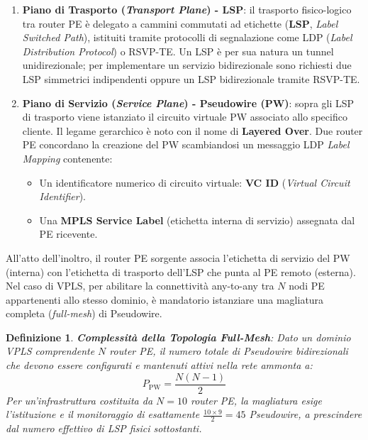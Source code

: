 \documentclass[11pt, a4paper]{article}
\newtheorem{theorem}{Definizione}
\begin{document}
\begin{enumerate}
    \item \textbf{Piano di Trasporto (\emph{Transport Plane}) - LSP}: il trasporto fisico-logico tra router PE è delegato a cammini commutati ad etichette (\textbf{LSP}, \emph{Label Switched Path}), istituiti tramite protocolli di segnalazione come LDP (\emph{Label Distribution Protocol}) o RSVP-TE. Un LSP è per sua natura un tunnel unidirezionale; per implementare un servizio bidirezionale sono richiesti due LSP simmetrici indipendenti oppure un LSP bidirezionale tramite RSVP-TE.
    \item \textbf{Piano di Servizio (\emph{Service Plane}) - Pseudowire (PW)}: sopra gli LSP di trasporto viene istanziato il circuito virtuale PW associato allo specifico cliente. Il legame gerarchico è noto con il nome di \textbf{Layered Over}. Due router PE concordano la creazione del PW scambiandosi un messaggio LDP \emph{Label Mapping} contenente:
    \begin{itemize}[noitemsep]
        \item Un identificatore numerico di circuito virtuale: \textbf{VC ID} (\emph{Virtual Circuit Identifier}).
        \item Una \textbf{MPLS Service Label} (etichetta interna di servizio) assegnata dal PE ricevente.
    \end{itemize}
\end{enumerate}

All'atto dell'inoltro, il router PE sorgente associa l'etichetta di servizio del PW (interna) con l'etichetta di trasporto dell'LSP che punta al PE remoto (esterna). Nel caso di VPLS, per abilitare la connettività any-to-any tra $N$ nodi PE appartenenti allo stesso dominio, è mandatorio istanziare una magliatura completa (\emph{full-mesh}) di Pseudowire.

\begin{theorem}
\textbf{Complessità della Topologia Full-Mesh}:
Dato un dominio VPLS comprendente $N$ router PE, il numero totale di Pseudowire bidirezionali che devono essere configurati e mantenuti attivi nella rete ammonta a:
\begin{equation}
    P_{\text{PW}} = \frac{N(N - 1)}{2}
\end{equation}
Per un'infrastruttura costituita da $N = 10$ router PE, la magliatura esige l'istituzione e il monitoraggio di esattamente $\frac{10 \times 9}{2} = 45$ Pseudowire, a prescindere dal numero effettivo di LSP fisici sottostanti.
\end{theorem}
\end{document}
